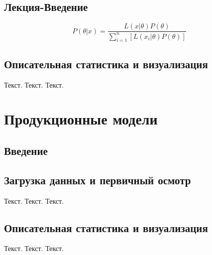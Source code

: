 \documentclass[
  letterpaper,
  DIV=11,
  numbers=noendperiod]{scrreprt}
\begin{document}
\section{Лекция-Введение}\label{ux43bux435ux43aux446ux438ux44f-ux432ux432ux435ux434ux435ux43dux438ux435}

\[  
P(\theta|x)=\frac{L(x|\theta)P(\theta)}{\sum\limits_{i=1}^{n}{\left[ L(x_i|\theta)P(\theta)\right]}}  
\]

\section{Описательная статистика и
визуализация}\label{ux43eux43fux438ux441ux430ux442ux435ux43bux44cux43dux430ux44f-ux441ux442ux430ux442ux438ux441ux442ux438ux43aux430-ux438-ux432ux438ux437ux443ux430ux43bux438ux437ux430ux446ux438ux44f-3}

Текст. Текст. Текст.


\chapter{Продукционные
модели}\label{ux43fux440ux43eux434ux443ux43aux446ux438ux43eux43dux43dux44bux435-ux43cux43eux434ux435ux43bux438}

\section{Введение}\label{ux432ux432ux435ux434ux435ux43dux438ux435-5}

\section{Загрузка данных и первичный
осмотр}\label{ux437ux430ux433ux440ux443ux437ux43aux430-ux434ux430ux43dux43dux44bux445-ux438-ux43fux435ux440ux432ux438ux447ux43dux44bux439-ux43eux441ux43cux43eux442ux440-3}

Текст. Текст. Текст.

\section{Описательная статистика и
визуализация}\label{ux43eux43fux438ux441ux430ux442ux435ux43bux44cux43dux430ux44f-ux441ux442ux430ux442ux438ux441ux442ux438ux43aux430-ux438-ux432ux438ux437ux443ux430ux43bux438ux437ux430ux446ux438ux44f-4}

Текст. Текст. Текст.
\end{document}
